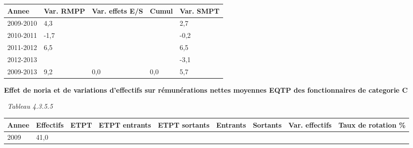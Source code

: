 \begin{longtable}[]{@{}lllll@{}}
\toprule
Annee & Var. RMPP & Var. effets E/S & Cumul & Var. SMPT\tabularnewline
\midrule
\endhead
2009-2010 & 4,3 & & & 2,7\tabularnewline
2010-2011 & -1,7 & & & -0,2\tabularnewline
2011-2012 & 6,5 & & & 6,5\tabularnewline
2012-2013 & & & & -3,1\tabularnewline
2009-2013 & 9,2 & 0,0 & 0,0 & 5,7\tabularnewline
\bottomrule
\end{longtable}

\textbf{Effet de noria et de variations d'effectifs sur rémunérations
nettes moyennes EQTP des fonctionnaires de categorie C}

~\emph{Tableau 4.3.5.5}

\begin{longtable}[]{@{}lllllllll@{}}
\toprule
\begin{minipage}[b]{0.05\columnwidth}\raggedright
Annee\strut
\end{minipage} & \begin{minipage}[b]{0.08\columnwidth}\raggedright
Effectifs\strut
\end{minipage} & \begin{minipage}[b]{0.04\columnwidth}\raggedright
ETPT\strut
\end{minipage} & \begin{minipage}[b]{0.10\columnwidth}\raggedright
ETPT entrants\strut
\end{minipage} & \begin{minipage}[b]{0.10\columnwidth}\raggedright
ETPT sortants\strut
\end{minipage} & \begin{minipage}[b]{0.07\columnwidth}\raggedright
Entrants\strut
\end{minipage} & \begin{minipage}[b]{0.07\columnwidth}\raggedright
Sortants\strut
\end{minipage} & \begin{minipage}[b]{0.11\columnwidth}\raggedright
Var. effectifs\strut
\end{minipage} & \begin{minipage}[b]{0.14\columnwidth}\raggedright
Taux de rotation \%\strut
\end{minipage}\tabularnewline
\midrule
\endhead
\begin{minipage}[t]{0.05\columnwidth}\raggedright
2009\strut
\end{minipage} & \begin{minipage}[t]{0.08\columnwidth}\raggedright
41,0\strut
\end{minipage} & \begin{minipage}[t]{0.04\columnwidth}\raggedright

\end{minipage}
\end{longtable}
